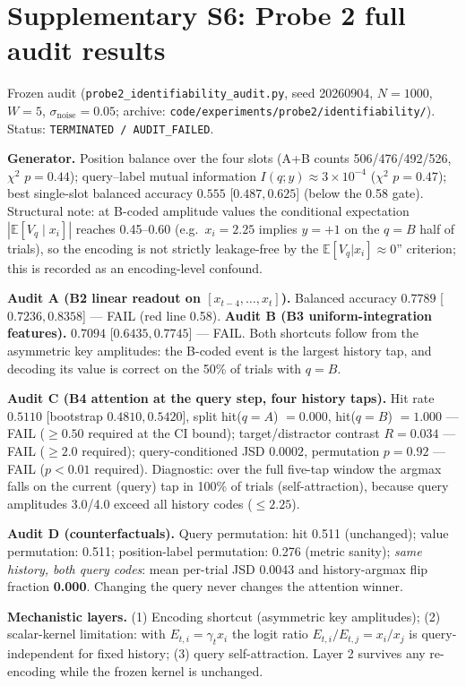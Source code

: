 \section{Supplementary S6: Probe 2 full audit results}

Frozen audit (\texttt{probe2\_\allowbreak{}identifiability\_\allowbreak{}audit.py}, seed 20260904,
$N=1000$, $W=5$, $\sigma_{\text{noise}}=0.05$; archive:
\texttt{code/experiments/probe2/identifiability/}).  Status:
\texttt{TERMINATED / AUDIT\_\allowbreak{}FAILED}.

\textbf{Generator.} Position balance over the four slots (A+B counts
506/476/492/526, $\chi^2$ $p=0.44$); query--label mutual information
$I(q;y)\approx 3\times10^{-4}$ ($\chi^2$ $p=0.47$); best single-slot
balanced accuracy $0.555$ [$0.487,0.625$] (below the 0.58 gate).
Structural note: at B-coded amplitude values the conditional expectation
$|\mathbb{E}[V_q \mid x_i]|$ reaches 0.45--0.60 (e.g.\ $x_i = 2.25$
implies $y=+1$ on the $q=B$ half of trials), so the encoding is not
strictly leakage-free by the \texttt{}$\mathbb{E}[V_q|x_i]\approx 0$''
criterion; this is recorded as an encoding-level confound.

\textbf{Audit A (B2 linear readout on $[x_{t-4},\dots,x_t]$).}
Balanced accuracy $0.7789$ [$0.7236,0.8358$] --- FAIL (red line 0.58).
\textbf{Audit B (B3 uniform-integration features).} $0.7094$
[$0.6435,0.7745$] --- FAIL.  Both shortcuts follow from the asymmetric
key amplitudes: the B-coded event is the largest history tap, and
decoding its value is correct on the 50\% of trials with $q=B$.

\textbf{Audit C (B4 attention at the query step, four history taps).}
Hit rate $0.5110$ [bootstrap $0.4810,0.5420$], split hit($q{=}A$)
$=0.000$, hit($q{=}B$) $=1.000$ --- FAIL ($\geq 0.50$ required at the CI
bound); target/distractor contrast $R = 0.034$ --- FAIL ($\geq 2.0$
required); query-conditioned JSD $0.0002$, permutation $p = 0.92$ ---
FAIL ($p<0.01$ required).  Diagnostic: over the full five-tap window the
argmax falls on the current (query) tap in 100\% of trials
(self-attraction), because query amplitudes 3.0/4.0 exceed all history
codes ($\leq 2.25$).

\textbf{Audit D (counterfactuals).} Query permutation: hit 0.511
(unchanged); value permutation: 0.511; position-label permutation: 0.276
(metric sanity); \emph{same history, both query codes}: mean per-trial
JSD 0.0043 and history-argmax flip fraction \textbf{0.000}.  Changing
the query never changes the attention winner.

\textbf{Mechanistic layers.} (1) Encoding shortcut (asymmetric key
amplitudes); (2) scalar-kernel limitation: with
$E_{t,i} = \gamma_t x_i$ the logit ratio $E_{t,i}/E_{t,j} = x_i/x_j$ is
query-independent for fixed history; (3) query self-attraction.  Layer 2
survives any re-encoding while the frozen kernel is unchanged.

